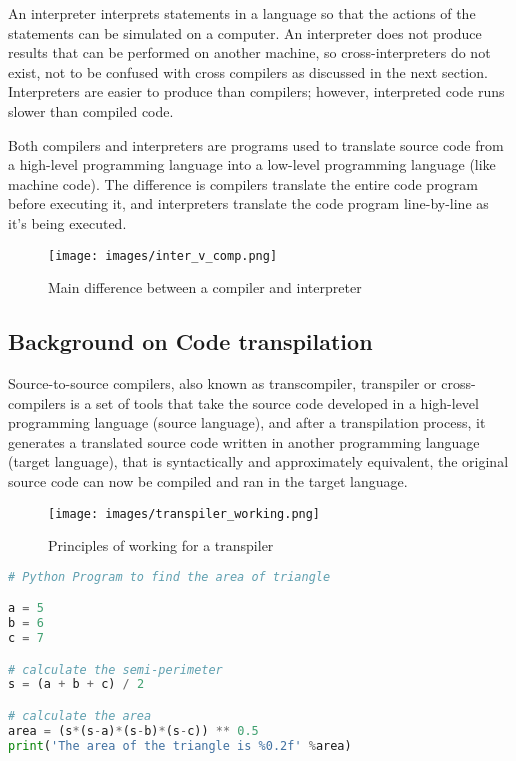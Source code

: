 An interpreter interprets statements in a language so that the actions of the statements can be simulated on a computer. An interpreter does not produce results that can be performed on another machine, so cross-interpreters do not exist, not to be confused with cross compilers as discussed in the next section. Interpreters are easier to produce than compilers; however, interpreted code runs slower than compiled code. \cite{Grillmeyer1998}

Both compilers and interpreters are programs used to translate source code from a high-level programming language into a low-level programming language (like machine code). The difference is compilers translate the entire code program before executing it, and interpreters translate the code program line-by-line as it's being executed.

\begin{figure}[H]
    \centering
    \texttt{[image: images/inter\_v\_comp.png]}
    \caption{Main difference between a compiler and interpreter}
    \label{fig:comp_v_inter}
\end{figure}


\subsection{Background on Code transpilation} \label{section:transpilation_background}
Source-to-source compilers, also known as transcompiler, transpiler or cross-compilers is a set of tools that take the source code developed in a high-level programming language (source language), and after a transpilation process, it generates a translated source code written in another programming language (target language), that is syntactically and approximately equivalent, the original source code can now be compiled and ran in the target language.

\begin{figure}[H]
    \centering
    \texttt{[image: images/transpiler\_working.png]}
    \caption{Principles of working for a transpiler}
    \label{fig:transpiler_working}
\end{figure}

\begin{lstlisting}[language=Python, caption=Example of python user code]
# Python Program to find the area of triangle

a = 5
b = 6
c = 7

# calculate the semi-perimeter
s = (a + b + c) / 2

# calculate the area
area = (s*(s-a)*(s-b)*(s-c)) ** 0.5
print('The area of the triangle is %0.2f' %area)

\end{lstlisting}

